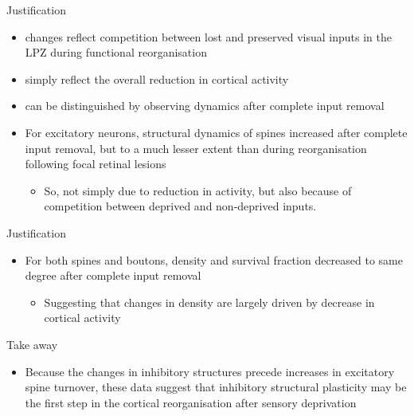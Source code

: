 \begin{frame}{Justification}
  \begin{itemize}
    \item changes reflect competition between lost and preserved visual inputs in the LPZ during functional reorganisation
      \pause
    \item simply reflect the overall reduction in cortical activity
      \pause
    \item can be distinguished by observing dynamics after \alert{complete} input removal
      \pause
    \item For excitatory neurons, structural dynamics of \alert{spines} increased after \alert{complete} input removal, but to a much lesser extent than during reorganisation following focal retinal lesions
    \begin{itemize}
      \item So, not simply due to reduction in activity, but also because of competition between deprived and non-deprived inputs.
    \end{itemize}
  \end{itemize}
\end{frame}
\begin{frame}{Justification}
  \begin{itemize}
    \item For both spines and boutons, density and survival fraction decreased to same degree after \alert{complete} input removal
    \begin{itemize}
      \item Suggesting that changes in density are largely driven by decrease in cortical activity
    \end{itemize}
  \end{itemize}
\end{frame}
\begin{frame}{Take away}
  \begin{itemize}
    \item Because the changes in inhibitory structures precede increases in excitatory spine turnover, these data suggest that inhibitory structural plasticity may be the first step in the cortical reorganisation after sensory deprivation
  \end{itemize}
\end{frame}
